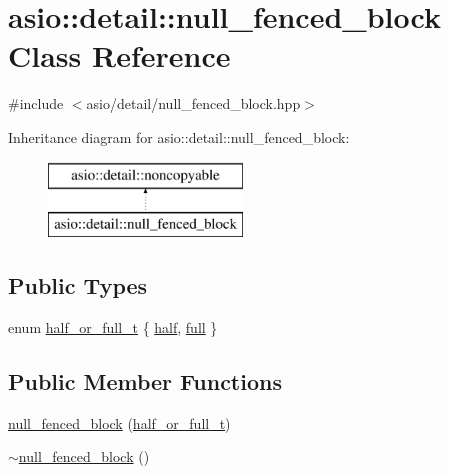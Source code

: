 \hypertarget{classasio_1_1detail_1_1null__fenced__block}{}\section{asio\+:\+:detail\+:\+:null\+\_\+fenced\+\_\+block Class Reference}
\label{classasio_1_1detail_1_1null__fenced__block}


{\ttfamily \#include $<$asio/detail/null\+\_\+fenced\+\_\+block.\+hpp$>$}

Inheritance diagram for asio\+:\+:detail\+:\+:null\+\_\+fenced\+\_\+block\+:\begin{figure}[H]
\begin{center}
\leavevmode
\includegraphics[height=2.000000cm]{classasio_1_1detail_1_1null__fenced__block}
\end{center}
\end{figure}
\subsection*{Public Types}
\begin{DoxyCompactItemize}
\item 
enum \hyperlink{classasio_1_1detail_1_1null__fenced__block_a21c66218b4c10beb58f227cc40b655df}{half\+\_\+or\+\_\+full\+\_\+t} \{ \hyperlink{classasio_1_1detail_1_1null__fenced__block_a21c66218b4c10beb58f227cc40b655dfa29ffa18b5d61c64e079ea16805204313}{half}, 
\hyperlink{classasio_1_1detail_1_1null__fenced__block_a21c66218b4c10beb58f227cc40b655dfa267449df5188d34568ed687c76e54bea}{full}
 \}
\end{DoxyCompactItemize}
\subsection*{Public Member Functions}
\begin{DoxyCompactItemize}
\item 
\hyperlink{classasio_1_1detail_1_1null__fenced__block_aaa43245032f780a9fbd1325e185b2ea2}{null\+\_\+fenced\+\_\+block} (\hyperlink{classasio_1_1detail_1_1null__fenced__block_a21c66218b4c10beb58f227cc40b655df}{half\+\_\+or\+\_\+full\+\_\+t})
\item 
\hyperlink{classasio_1_1detail_1_1null__fenced__block_a54d024899282a0d1dd76a8f0c1adbe35}{$\sim$null\+\_\+fenced\+\_\+block} ()
\end{DoxyCompactItemize}


